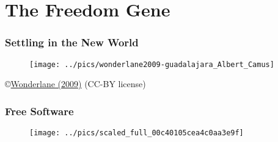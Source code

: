 % 
\section{The Freedom Gene}

\begin{frame}
	\frametitle{Settling in the New World}
	\begin{figure} %
		\texttt{[image: ../pics/wonderlane2009-guadalajara\_Albert\_Camus]}
	\end{figure}
	\tiny \copyright \href{https://www.flickr.com/photos/wonderlane/3527244519}{Wonderlane (2009)} (CC-BY license)
\end{frame}



\begin{frame}   %
	\frametitle{Free Software}
	\begin{figure}
		\texttt{[image: ../pics/scaled\_full\_00c40105cea4c0aa3e9f]}
	\end{figure}
\end{frame}

